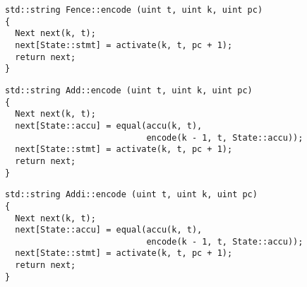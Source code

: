 
\begin{lstlisting}[style=c++, style=encode]
std::string Fence::encode (uint t, uint k, uint pc)
{
  Next next(k, t);
  next[State::stmt] = activate(k, t, pc + 1);
  return next;
}
\end{lstlisting}


\begin{lstlisting}[style=c++, style=encode]
std::string Add::encode (uint t, uint k, uint pc)
{
  Next next(k, t);
  next[State::accu] = equal(accu(k, t),
                            encode(k - 1, t, State::accu));
  next[State::stmt] = activate(k, t, pc + 1);
  return next;
}
\end{lstlisting}


\newpage

\begin{lstlisting}[style=c++, style=encode]
std::string Addi::encode (uint t, uint k, uint pc)
{
  Next next(k, t);
  next[State::accu] = equal(accu(k, t),
                            encode(k - 1, t, State::accu));
  next[State::stmt] = activate(k, t, pc + 1);
  return next;
}
\end{lstlisting}


